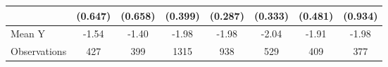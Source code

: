 {\begin{tabular}{l*{7}{c}}
            &     (0.647)         &     (0.658)         &     (0.399)         &     (0.287)         &     (0.333)         &     (0.481)         &     (0.934)         \\
\midrule
Mean Y      &       -1.54         &       -1.40         &       -1.98         &       -1.98         &       -2.04         &       -1.91         &       -1.98         \\
Observations&         427         &         399         &        1315         &         938         &         529         &         409         &         377         \\
\bottomrule
\end{tabular}
}
